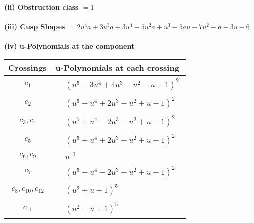 \documentclass[1p]{elsarticle_modified}
\theoremstyle{definition}
\begin{document}
\flushleft \textbf{(ii) Obstruction class $= 1$}\\~\\
\flushleft \textbf{(iii) Cusp Shapes $= 2 u^4 a+3 u^3 a+3 u^4-5 u^2 a+u^3-5 a u-7 u^2- a-3 u-6$}\\~\\
\newpage\renewcommand{\arraystretch}{1}
\flushleft \textbf{(iv) u-Polynomials at the component}\newline \\
\begin{tabular}{m{50pt}|m{274pt}}
Crossings & \hspace{64pt}u-Polynomials at each crossing \\
\hline $$\begin{aligned}c_{1}\end{aligned}$$&$\begin{aligned}
&(u^5-3 u^4+4 u^3- u^2- u+1)^2
\end{aligned}$\\
\hline $$\begin{aligned}c_{2}\end{aligned}$$&$\begin{aligned}
&(u^5- u^4+2 u^3- u^2+u-1)^2
\end{aligned}$\\
\hline $$\begin{aligned}c_{3},c_{4}\end{aligned}$$&$\begin{aligned}
&(u^5+u^4-2 u^3- u^2+u-1)^2
\end{aligned}$\\
\hline $$\begin{aligned}c_{5}\end{aligned}$$&$\begin{aligned}
&(u^5+u^4+2 u^3+u^2+u+1)^2
\end{aligned}$\\
\hline $$\begin{aligned}c_{6},c_{9}\end{aligned}$$&$\begin{aligned}
&u^{10}
\end{aligned}$\\
\hline $$\begin{aligned}c_{7}\end{aligned}$$&$\begin{aligned}
&(u^5- u^4-2 u^3+u^2+u+1)^2
\end{aligned}$\\
\hline $$\begin{aligned}c_{8},c_{10},c_{12}\end{aligned}$$&$\begin{aligned}
&(u^2+u+1)^5
\end{aligned}$\\
\hline $$\begin{aligned}c_{11}\end{aligned}$$&$\begin{aligned}
&(u^2- u+1)^5
\end{aligned}$\\
\hline
\end{tabular}\\~\\
\end{document}

